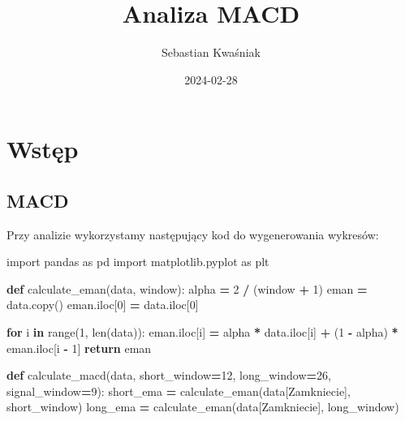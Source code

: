 \documentclass[
]{article}
\title{Analiza MACD}
\author{Sebastian Kwaśniak}
\date{2024-02-28}
\newenvironment{Shaded}{\begin{snugshade}}{\end{snugshade}}
\newcommand{\BuiltInTok}[1]{#1}
\newcommand{\ControlFlowTok}[1]{\textcolor[rgb]{0.13,0.29,0.53}{\textbf{#1}}}
\newcommand{\DecValTok}[1]{\textcolor[rgb]{0.00,0.00,0.81}{#1}}
\newcommand{\ImportTok}[1]{#1}
\newcommand{\KeywordTok}[1]{\textcolor[rgb]{0.13,0.29,0.53}{\textbf{#1}}}
\newcommand{\NormalTok}[1]{#1}
\newcommand{\OperatorTok}[1]{\textcolor[rgb]{0.81,0.36,0.00}{\textbf{#1}}}
\newcommand{\StringTok}[1]{\textcolor[rgb]{0.31,0.60,0.02}{#1}}
\begin{document}
\maketitle

\section{Wstęp}\label{wstux119p}

\subsection{MACD}\label{macd}

Przy analizie wykorzystamy następujący kod do wygenerowania wykresów:

\begin{Shaded}
\begin{Highlighting}[]
\ImportTok{import}\NormalTok{ pandas }\ImportTok{as}\NormalTok{ pd}
\ImportTok{import}\NormalTok{ matplotlib.pyplot }\ImportTok{as}\NormalTok{ plt}

\KeywordTok{def}\NormalTok{ calculate\_eman(data, window):}
\NormalTok{    alpha }\OperatorTok{=} \DecValTok{2} \OperatorTok{/}\NormalTok{ (window }\OperatorTok{+} \DecValTok{1}\NormalTok{)}
\NormalTok{    eman }\OperatorTok{=}\NormalTok{ data.copy()}
\NormalTok{    eman.iloc[}\DecValTok{0}\NormalTok{] }\OperatorTok{=}\NormalTok{ data.iloc[}\DecValTok{0}\NormalTok{]}

    \ControlFlowTok{for}\NormalTok{ i }\KeywordTok{in} \BuiltInTok{range}\NormalTok{(}\DecValTok{1}\NormalTok{, }\BuiltInTok{len}\NormalTok{(data)):}
\NormalTok{        eman.iloc[i] }\OperatorTok{=}\NormalTok{ alpha }\OperatorTok{*}\NormalTok{ data.iloc[i] }\OperatorTok{+}\NormalTok{ (}\DecValTok{1} \OperatorTok{{-}}\NormalTok{ alpha) }\OperatorTok{*}\NormalTok{ eman.iloc[i }\OperatorTok{{-}} \DecValTok{1}\NormalTok{]}
    \ControlFlowTok{return}\NormalTok{ eman}

\KeywordTok{def}\NormalTok{ calculate\_macd(data, short\_window}\OperatorTok{=}\DecValTok{12}\NormalTok{, long\_window}\OperatorTok{=}\DecValTok{26}\NormalTok{, signal\_window}\OperatorTok{=}\DecValTok{9}\NormalTok{):}
\NormalTok{    short\_ema }\OperatorTok{=}\NormalTok{ calculate\_eman(data[}\StringTok{\textquotesingle{}Zamkniecie\textquotesingle{}}\NormalTok{], short\_window)}
\NormalTok{    long\_ema }\OperatorTok{=}\NormalTok{ calculate\_eman(data[}\StringTok{\textquotesingle{}Zamkniecie\textquotesingle{}}\NormalTok{], long\_window)}


\end{Highlighting}
\end{Shaded}
\end{document}
